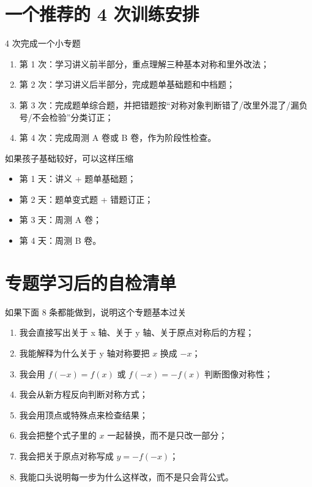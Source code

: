 \documentclass[11pt,a4paper,fontset=fandol]{ctexart}
\begin{document}
\section{一个推荐的 4 次训练安排}

\begin{goalbox}{4 次完成一个小专题}
\begin{enumerate}
  \item 第 1 次：学习讲义前半部分，重点理解三种基本对称和里外改法；
  \item 第 2 次：学习讲义后半部分，完成题单基础题和中档题；
  \item 第 3 次：完成题单综合题，并把错题按“对称对象判断错了/改里外混了/漏负号/不会检验”分类订正；
  \item 第 4 次：完成周测 A 卷或 B 卷，作为阶段性检查。
\end{enumerate}
\end{goalbox}

\begin{infobox}{如果孩子基础较好，可以这样压缩}
\begin{itemize}
  \item 第 1 天：讲义 + 题单基础题；
  \item 第 2 天：题单变式题 + 错题订正；
  \item 第 3 天：周测 A 卷；
  \item 第 4 天：周测 B 卷。
\end{itemize}
\end{infobox}

\section{专题学习后的自检清单}

\begin{goalbox}{如果下面 8 条都能做到，说明这个专题基本过关}
\begin{enumerate}
  \item 我会直接写出关于 x 轴、关于 y 轴、关于原点对称后的方程；
  \item 我能解释为什么关于 y 轴对称要把 $x$ 换成 $-x$；
  \item 我会用 $f(-x)=f(x)$ 或 $f(-x)=-f(x)$ 判断图像对称性；
  \item 我会从新方程反向判断对称方式；
  \item 我会用顶点或特殊点来检查结果；
  \item 我会把整个式子里的 $x$ 一起替换，而不是只改一部分；
  \item 我会把关于原点对称写成 $y=-f(-x)$；
  \item 我能口头说明每一步为什么这样改，而不是只会背公式。
\end{enumerate}
\end{goalbox}
\end{document}
